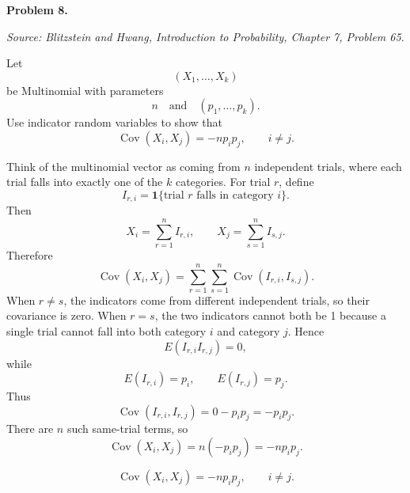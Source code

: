 \documentclass[11pt]{article}
\newcommand{\source}[2]{%
    \vspace{0.15cm}
    {\small\textit{Source: Blitzstein and Hwang, \textit{Introduction to Probability}, Chapter #1, Problem #2.}}
}
\begin{document}

\begin{problemheader}
\textbf{Problem 8. }
\end{problemheader}
\source{7}{65}

Let
\[
(X_1,\dots,X_k)
\]
be Multinomial with parameters
\[
n \quad \text{and} \quad (p_1,\dots,p_k).
\]
Use indicator random variables to show that
\[
\operatorname{Cov}(X_i,X_j)=-np_ip_j,
\qquad i\ne j.
\]

\begin{solutionbox}
Think of the multinomial vector as coming from \(n\) independent trials, where each trial falls into exactly one of the \(k\) categories. For trial \(r\), define
\[
I_{r,i}=\mathbf{1}\{\text{trial }r\text{ falls in category }i\}.
\]
Then
\[
X_i=\sum_{r=1}^n I_{r,i},
\qquad
X_j=\sum_{s=1}^n I_{s,j}.
\]
Therefore
\[
\operatorname{Cov}(X_i,X_j)
=
\sum_{r=1}^n\sum_{s=1}^n \operatorname{Cov}(I_{r,i},I_{s,j}).
\]
When \(r\ne s\), the indicators come from different independent trials, so their covariance is zero. When \(r=s\), the two indicators cannot both be 1 because a single trial cannot fall into both category \(i\) and category \(j\). Hence
\[
E(I_{r,i}I_{r,j})=0,
\]
while
\[
E(I_{r,i})=p_i,
\qquad
E(I_{r,j})=p_j.
\]
Thus
\[
\operatorname{Cov}(I_{r,i},I_{r,j})
=0-p_ip_j
=-p_ip_j.
\]
There are \(n\) such same-trial terms, so
\[
\operatorname{Cov}(X_i,X_j)=n(-p_ip_j)=-np_ip_j.
\]

\begin{finalanswerbox}
\[
\operatorname{Cov}(X_i,X_j)=-np_ip_j,
\qquad i\ne j.
\]
\end{finalanswerbox}
\end{solutionbox}
\end{document}

